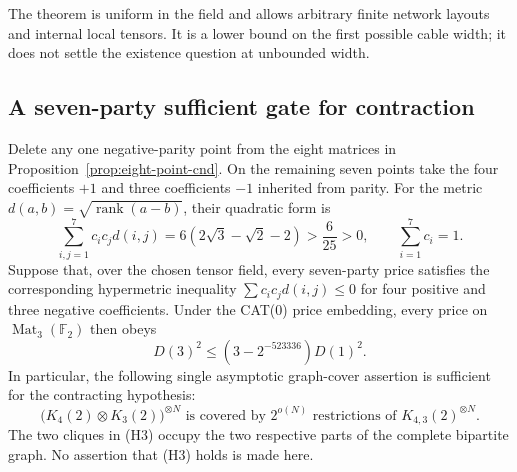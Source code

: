The theorem is uniform in the field and allows arbitrary
finite network layouts and internal local tensors.
It is a lower bound on the first possible cable width;
it does not settle the existence question at unbounded width.

\subsection{A seven-party sufficient gate for contraction}

\begin{proposition}
\label{prop:seven-point-hypermetric}
Delete any one negative-parity point from the eight matrices
in Proposition~\ref{prop:eight-point-cnd}.  On the remaining
seven points take the four coefficients $+1$ and three
coefficients $-1$ inherited from parity.  For the metric
$d(a,b)=\sqrt{\operatorname{rank}(a-b)}$, their quadratic
form is
\[
 \sum_{i,j=1}^7c_i c_j d(i,j)
 =6(2\sqrt3-\sqrt2-2)>\frac6{25}>0,
 \qquad\sum_{i=1}^7c_i=1.                         \tag{H1}
\]
Suppose that, over the chosen tensor field, every seven-party
price satisfies the corresponding hypermetric inequality
$\sum c_i c_j d(i,j)\le0$ for four positive and three
negative coefficients.  Under the CAT(0) price embedding,
every price on $\operatorname{Mat}_3(\mathbb F_2)$ then obeys
\[
 D(3)^2\le(3-2^{-523336})D(1)^2.
 \tag{H2}
\]
In particular, the following single asymptotic graph-cover
assertion is sufficient for the contracting hypothesis:
\[
 \bigl(K_4(2)\otimes K_3(2)\bigr)^{\otimes N}
 \text{ is covered by }2^{o(N)}\text{ restrictions of }
 K_{4,3}(2)^{\otimes N}.                          \tag{H3}
\]
The two cliques in (H3) occupy the two respective parts of
the complete bipartite graph.  No assertion that (H3) holds
is made here.
\end{proposition}
